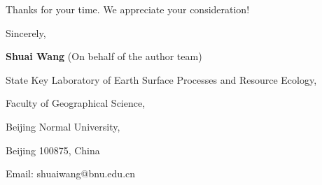 \documentclass[11pt,a4paper,roman]{moderncv}
\begin{document}
\vspace{0.3cm}

Thanks for your time. We appreciate your consideration!

\vspace{0.3cm}

Sincerely,

\textbf{Shuai Wang} (On behalf of the author team)


State Key Laboratory of Earth Surface Processes and Resource Ecology,

Faculty of Geographical Science,

Beijing Normal University,

Beijing 100875, China

Email: shuaiwang@bnu.edu.cn
\end{document}
